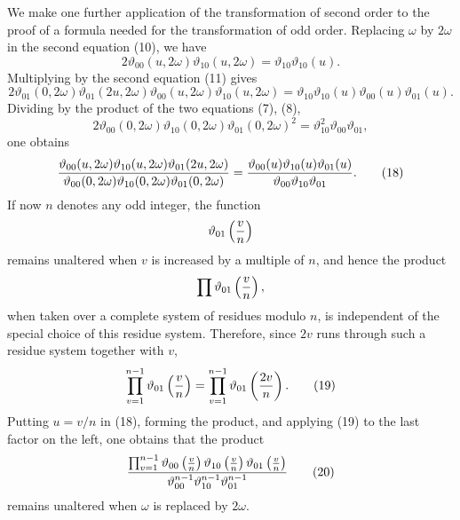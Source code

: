 \documentclass[11pt]{article}
\providecommand{\tht}{\vartheta}
\begin{document}
We make one further application of the transformation of second order to the proof of a formula needed for the transformation of odd order. Replacing $\omega$ by $2\omega$ in the second equation (10), we have
\[
2\tht_{00}(u,2\omega)\tht_{10}(u,2\omega)=\tht_{10}\tht_{10}(u).
\]
Multiplying by the second equation (11) gives
\[
2\tht_{01}(0,2\omega)\tht_{01}(2u,2\omega)\tht_{00}(u,2\omega)\tht_{10}(u,2\omega)
=\tht_{10}\tht_{10}(u)\tht_{00}(u)\tht_{01}(u).
\]
Dividing by the product of the two equations (7), (8),
\[
2\tht_{00}(0,2\omega)\tht_{10}(0,2\omega)\tht_{01}(0,2\omega)^2
=\tht_{10}^2\tht_{00}\tht_{01},
\]
one obtains
\begin{equation}
{\tht_{00}(u,2\omega)\tht_{10}(u,2\omega)\tht_{01}(2u,2\omega)
\over
\tht_{00}(0,2\omega)\tht_{10}(0,2\omega)\tht_{01}(0,2\omega)}
=
{\tht_{00}(u)\tht_{10}(u)\tht_{01}(u)
\over \tht_{00}\tht_{10}\tht_{01}}. \tag{18}
\end{equation}
If now $n$ denotes any odd integer, the function
\[
\tht_{01}\left({v\over n}\right)
\]
remains unaltered when $v$ is increased by a multiple of $n$, and hence the product
\[
\prod \tht_{01}\left({v\over n}\right),
\]
when taken over a complete system of residues modulo $n$, is independent of the special choice of this residue system. Therefore, since $2v$ runs through such a residue system together with $v$,
\begin{equation}
\prod_{v=1}^{n-1}\tht_{01}\left({v\over n}\right)
=\prod_{v=1}^{n-1}\tht_{01}\left({2v\over n}\right). \tag{19}
\end{equation}
Putting $u=v/n$ in (18), forming the product, and applying (19) to the last factor on the left, one obtains that the product
\begin{equation}
{\prod_{v=1}^{n-1}\tht_{00}\left({v\over n}\right)
\tht_{10}\left({v\over n}\right)
\tht_{01}\left({v\over n}\right)
\over \tht_{00}^{n-1}\tht_{10}^{n-1}\tht_{01}^{n-1}} \tag{20}
\end{equation}
remains unaltered when $\omega$ is replaced by $2\omega$.
\end{document}
